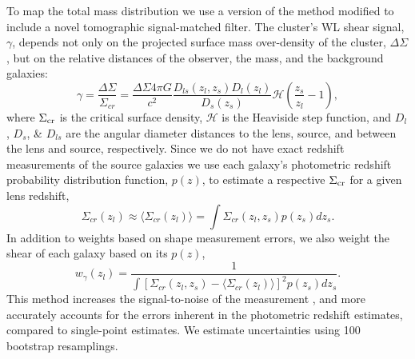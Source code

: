 To map the total mass distribution we use a version of the \citet{Fischer:1997ct} method modified to include a novel tomographic signal-matched filter.
The cluster's WL shear signal, $\gamma$, depends not only on the projected surface mass over-density of the cluster, $\Delta\Sigma$, but on the relative distances of the observer, the mass, and the background galaxies:
\begin{displaymath}
\gamma=\frac{\Delta\Sigma}{\Sigma_{cr}}=\frac{\Delta\Sigma4\pi G}{c^2}\frac{D_{ls}(z_l,z_s)D_l(z_l)}{D_s(z_s)}\mathcal{H}\left(\frac{z_s}{z_l}-1\right),
\end{displaymath}
where $\Sigma_{\rm cr}$ is the critical surface density, $\mathcal{H}$ is the Heaviside step function,  and $D_l$, $D_s$, \& $D_{ls}$ are the angular diameter distances to the lens, source, and between the lens and source, respectively.
Since we do not have exact redshift measurements of the source galaxies we use each galaxy's photometric redshift probability distribution function, $p(z)$, to estimate a respective $\Sigma_{\rm cr}$ for a given lens redshift,
\begin{displaymath}
\Sigma_{cr}(z_l)\approx\langle\Sigma_{cr}(z_l)\rangle=\int\Sigma_{cr}( z_l,z_s)p(z_s)dz_s.
\end{displaymath}
In addition to weights based on shape measurement errors, we also weight the shear of each galaxy based on its $p(z)$,
\begin{displaymath}
w_{\gamma}(z_l)=\frac{1}{\int\left[\Sigma_{cr}(z_l,z_s)-\langle\Sigma_{cr}(z_l)\rangle\right]^2p(z_s)dz_s}.
\end{displaymath}
This method increases the signal-to-noise of the measurement \citep[see e.g.][]{Hennawi:2005ig}, and more accurately accounts for the errors inherent in the photometric redshift estimates, compared to single-point estimates.
We estimate uncertainties using 100 bootstrap resamplings.

